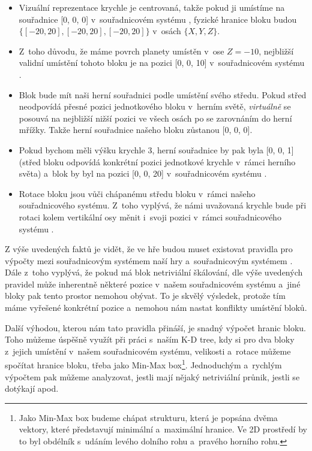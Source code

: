 \begin{itemize}
	\item Vizuální reprezentace krychle je centrovaná, takže pokud ji umístíme na souřadnice [0, 0, 0] v~souřadnicovém systému \UEu{}, fyzické hranice bloku budou $\{ [-20, 20], [-20, 20], [-20, 20]\}$ v~osách $\{X, Y, Z\}$.
	\item Z~toho důvodu, že máme povrch planety umístěn v~ose $Z = -10$, nejbližší validní umístění tohoto bloku je na pozici [0, 0, 10] v~souřadnicovém systému \UEu{}.
	\item Blok bude mít naši herní souřadnici podle umístění svého středu. Pokud střed neodpovídá přesné pozici jednotkového bloku v~herním světě, \textit{virtuálně} se posouvá na nejbližší nižší pozici ve všech osách po se zarovnáním do herní mřížky. Takže herní souřadnice našeho bloku zůstanou [0, 0, 0]. 
	\item Pokud bychom měli výšku krychle 3, herní souřadnice by pak byla [0, 0, 1] (střed bloku odpovídá konkrétní pozici jednotkové krychle v~rámci herního světa) a~blok by byl na pozici [0, 0, 20] v~souřadnicovém systému \UEu{}.
	\item Rotace bloku jsou vůči chápanému středu bloku v~rámci našeho souřadnicového systému. Z~toho vyplývá, že námi uvažovaná krychle bude při rotaci kolem vertikální osy měnit i~svoji pozici v~rámci souřadnicového systému \UEu{}.
\end{itemize}

Z výše uvedených faktů je vidět, že ve hře budou muset existovat pravidla pro výpočty mezi souřadnicovým systémem naší hry a~souřadnicovým systémem \UEu{}. Dále z~toho vyplývá, že pokud má blok netriviální škálování, dle výše uvedených pravidel může inherentně  některé pozice v~našem souřadnicovém systému a~jiné bloky pak tento prostor nemohou obývat. To je skvělý výsledek, protože tím máme vyřešené konkrétní pozice a~nemohou nám nastat konflikty umístění bloků.

Další výhodou, kterou nám tato pravidla přináší, je snadný výpočet hranic bloku. Toho můžeme úspěšně využít při práci s~naším K-D tree, kdy si pro dva bloky z~jejich umístění v~našem souřadnicovém systému, velikosti a~rotace můžeme spočítat hranice bloku, třeba jako Min-Max box\footnote{Jako Min-Max box budeme chápat strukturu, která je popsána dvěma vektory, které představují minimální a~maximální hranice. Ve 2D prostředí by to byl obdélník s~udáním levého dolního rohu a~pravého horního rohu.}. Jednoduchým a~rychlým výpočtem pak můžeme analyzovat, jestli mají nějaký netriviální průnik, jestli se dotýkají apod.

